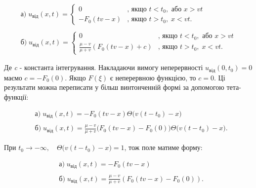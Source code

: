\begin{equation} 
    \begin{aligned} 
            &\text{а)}\;u_{\text{від}}(x,t) =
                \begin{cases}
                    0 & \text{, якщо } t < t_0, \text{ або } x > vt \\
                    -F_0(tv - x) & \text{, якщо } t > t_0,\;x < vt.
                \end{cases}
            & \\
            & \\
            &\text{б)}\;u_{\text{від}}(x,t)=
                \begin{cases}
                    0 & \text{, якщо } t < t_0, \text{ або } x > vt \\
                    \frac{\mu - v}{\mu + v}(F_0(tv - x) + c) & \text{, якщо } t > t_0,\;x < vt.
                \end{cases}
    \end{aligned} 
\end{equation}

Де \textit{c} - константа інтегрування. Накладаючи вимогу неперервності $u_{\text{від}}(0,t_0) = 0$ маємо $c = -F_0(0)$. Якщо $F(\xi)$ є неперервною функцією, то $c = 0$. Ці результати можна переписати у більш винтонченній формі за допомогою тета-функції:

\begin{equation} 
    \begin{aligned} 
            &\text{а)}\;u_{\text{від}}(x,t)=-F_0(tv-x) \Theta\big(v(t - t_0) - x\big)\\
            & \\
            &\text{б)}\;u_{\text{від}}(x,t)=\frac{\mu - v}{\mu + v} \big(F_0(tv-x)-F_0(0)\big) \Theta\big(v(t - t_0) - x\big).
    \end{aligned} 
\end{equation}

При $t_0 \rightarrow - \infty, \quad \Theta\big(v(t - t_0) - x\big) = 1$, тож поле матиме форму: 

\begin{equation} 
    \begin{aligned} 
            &\text{а)}\;u_{\text{від}}(x,t)=-F_0(tv - x)\\
            & \\
            &\text{б)}\;u_{\text{від}}(x,t) = \frac{\mu - v}{\mu + v} (F_0(tv - x) - F_0(0)).
    \end{aligned} 
\end{equation}


%